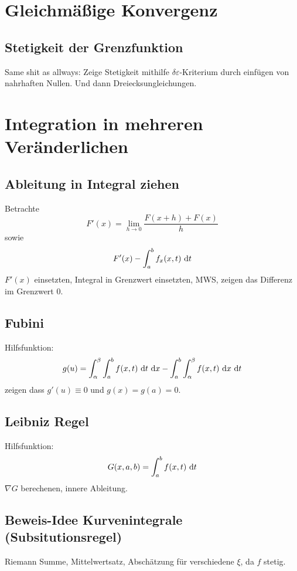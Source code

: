  \section{Gleichmäßige Konvergenz}

 \subsection{Stetigkeit der Grenzfunktion}
 Same shit as allways: Zeige Stetigkeit mithilfe $\delta\varepsilon$-Kriterium
 durch einfügen von nahrhaften Nullen. Und dann Dreiecksungleichungen. 

 \section{Integration in mehreren Veränderlichen}
 \subsection{Ableitung in Integral ziehen}
 Betrachte
 \begin{equation*}
     F'(x) = \lim_{h \to 0} \frac{F(x + h) + F(x)}{h}
 \end{equation*}
 sowie
 \begin{equation*}
     F'(x) - \int_a^b f_x(x,t) \text{ d}t
 \end{equation*}
 $F'(x)$ einsetzten, Integral in Grenzwert einsetzten, MWS,
 zeigen das Differenz im Grenzwert $0$.
 \subsection{Fubini}
 Hilfsfunktion:
 \begin{equation*}
     g(u) = \int_\alpha^\beta \int_a^b f(x,t) \text{ d}t \text{ d}x - \int_a^b \int_\alpha^\beta
     f(x,t) \text{ d}x \text{ d}t
 \end{equation*}
 zeigen dass $g'(u) \equiv 0$ und $g(x) = g(a) = 0$.

 \subsection{Leibniz Regel}
 Hilfsfunktion:
 \begin{equation*}
     G(x,a,b) = \int_a^b f(x,t) \text{ d}t
 \end{equation*}
 $\nabla G$ berechenen, innere Ableitung.

 \subsection{Beweis-Idee Kurvenintegrale (Subsitutionsregel)}
 Riemann Summe, Mittelwertsatz, Abschätzung für verschiedene $\xi$, da $f$ stetig.


